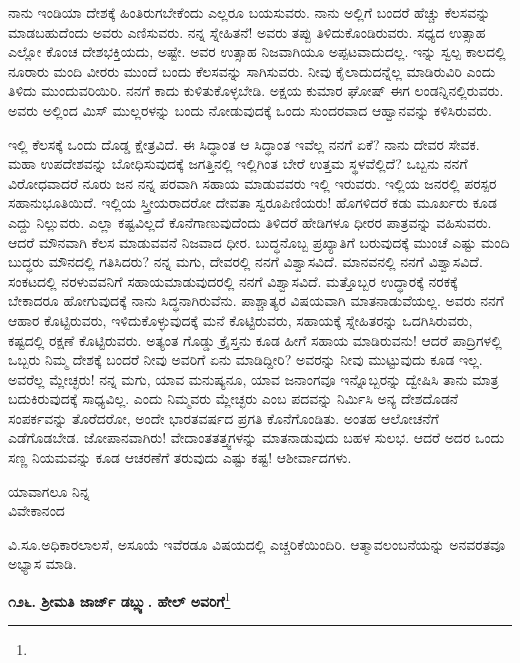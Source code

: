 ನಾನು ಇಂಡಿಯಾ ದೇಶಕ್ಕೆ ಹಿಂತಿರುಗಬೇಕೆಂದು ಎಲ್ಲರೂ ಬಯಸುವರು. ನಾನು ಅಲ್ಲಿಗೆ ಬಂದರೆ ಹೆಚ್ಚು ಕೆಲಸವನ್ನು ಮಾಡಬಹುದೆಂದು ಅವರು ಎಣಿಸುವರು. ನನ್ನ ಸ್ನೇಹಿತನೆ! ಅವರು ತಪ್ಪು ತಿಳಿದುಕೊಂಡಿರುವರು. ಸಧ್ಯದ ಉತ್ಸಾಹ ಎಲ್ಲೋ ಕೊಂಚ ದೇಶಭಕ್ತಿಯದು, ಅಷ್ಟೇ. ಅವರ ಉತ್ಸಾಹ ನಿಜವಾಗಿಯೂ ಅಪ್ಪಟವಾದುದಲ್ಲ. ಇನ್ನು ಸ್ವಲ್ಪ ಕಾಲದಲ್ಲಿ ನೂರಾರು ಮಂದಿ ವೀರರು ಮುಂದೆ ಬಂದು ಕೆಲಸವನ್ನು ಸಾಗಿಸುವರು. ನೀವು ಕೈಲಾದುದನ್ನೆಲ್ಲ ಮಾಡಿರುವಿರಿ ಎಂದು ತಿಳಿದು ಮುಂದುವರಿಯಿರಿ. ನನಗೆ ಕಾದು ಕುಳಿತುಕೊಳ್ಳಬೇಡಿ. ಅಕ್ಷಯ ಕುಮಾರ ಘೋಷ್ ಈಗ ಲಂಡನ್ನಿನಲ್ಲಿರುವರು. ಅವರು ಅಲ್ಲಿಂದ ಮಿಸ್ ಮುಲ್ಲರಳನ್ನು ಬಂದು ನೋಡುವುದಕ್ಕೆ ಒಂದು ಸುಂದರವಾದ ಆಹ್ವಾನವನ್ನು ಕಳಿಸಿರುವರು.

ಇಲ್ಲಿ ಕೆಲಸಕ್ಕೆ ಒಂದು ದೊಡ್ಡ ಕ್ಷೇತ್ರವಿದೆ. ಈ ಸಿದ್ಧಾಂತ ಆ ಸಿದ್ಧಾಂತ ಇವೆಲ್ಲ ನನಗೆ ಏಕೆ? ನಾನು ದೇವರ ಸೇವಕ. ಮಹಾ ಉಪದೇಶವನ್ನು ಬೋಧಿಸುವುದಕ್ಕೆ ಜಗತ್ತಿನಲ್ಲಿ ಇಲ್ಲಿಗಿಂತ ಬೇರೆ ಉತ್ತಮ ಸ್ಥಳವೆಲ್ಲಿದೆ? ಒಬ್ಬನು ನನಗೆ ವಿರೋಧವಾದರೆ ನೂರು ಜನ ನನ್ನ ಪರವಾಗಿ ಸಹಾಯ ಮಾಡುವವರು ಇಲ್ಲಿ ಇರುವರು. ಇಲ್ಲಿಯ ಜನರಲ್ಲಿ ಪರಸ್ಪರ ಸಹಾನುಭೂತಿಯಿದೆ. ಇಲ್ಲಿಯ ಸ್ತ್ರೀಯರಾದರೋ ದೇವತಾ ಸ್ವರೂಪಿಣಿಯರು! ಹೊಗಳಿದರೆ ಕಡು ಮೂರ್ಖರು ಕೂಡ ಎದ್ದು ನಿಲ್ಲುವರು. ಎಲ್ಲಾ ಕಷ್ಟವಿಲ್ಲದೆ ಕೊನೆಗಾಣುವುದೆಂದು ತಿಳಿದರೆ ಹೇಡಿಗಳೂ ಧೀರರ ಪಾತ್ರವನ್ನು ವಹಿಸುವರು. ಆದರೆ ಮೌನವಾಗಿ ಕೆಲಸ ಮಾಡುವವನೆ ನಿಜವಾದ ಧೀರ. ಬುದ್ಧನೊಬ್ಬ ಪ್ರಖ್ಯಾತಿಗೆ ಬರುವುದಕ್ಕೆ ಮುಂಚೆ ಎಷ್ಟು ಮಂದಿ ಬುದ್ಧರು ಮೌನದಲ್ಲಿ ಗತಿಸಿದರು? ನನ್ನ ಮಗು, ದೇವರಲ್ಲಿ ನನಗೆ ವಿಶ್ವಾಸವಿದೆ. ಮಾನವನಲ್ಲಿ ನನಗೆ ವಿಶ್ವಾಸವಿದೆ. ಸಂಕಟದಲ್ಲಿ ನರಳುವವನಿಗೆ ಸಹಾಯಮಾಡುವುದರಲ್ಲಿ ನನಗೆ ವಿಶ್ವಾಸವಿದೆ. ಮತ್ತೊಬ್ಬರ ಉದ್ಧಾರಕ್ಕೆ ನರಕಕ್ಕೆ ಬೇಕಾದರೂ ಹೋಗುವುದಕ್ಕೆ ನಾನು ಸಿದ್ಧನಾಗಿರುವೆನು. ಪಾಶ್ಚಾತ್ಯರ ವಿಷಯವಾಗಿ ಮಾತನಾಡುವೆಯಲ್ಲ. ಅವರು ನನಗೆ ಆಹಾರ ಕೊಟ್ಟಿರುವರು, ಇಳಿದುಕೊಳ್ಳುವುದಕ್ಕೆ ಮನೆ ಕೊಟ್ಟಿರುವರು, ಸಹಾಯಕ್ಕೆ ಸ್ನೇಹಿತರನ್ನು ಒದಗಿಸಿರುವರು, ಕಷ್ಟದಲ್ಲಿ ರಕ್ಷಣೆ ಕೊಟ್ಟಿರುವರು. ಅತ್ಯಂತ ಗೊಡ್ಡು ಕ್ರೈಸ್ತನು ಕೂಡ ಹೀಗೆ ಸಹಾಯ ಮಾಡಿರುವನು! ಆದರೆ ಪಾದ್ರಿಗಳಲ್ಲಿ ಒಬ್ಬರು ನಿಮ್ಮ ದೇಶಕ್ಕೆ ಬಂದರೆ ನೀವು ಅವರಿಗೆ ಏನು ಮಾಡಿದ್ದೀರಿ? ಅವರನ್ನು ನೀವು ಮುಟ್ಟುವುದು ಕೂಡ ಇಲ್ಲ. ಅವರೆಲ್ಲ ಮ್ಲೇಚ್ಛರು! ನನ್ನ ಮಗು, ಯಾವ ಮನುಷ್ಯನೂ, ಯಾವ ಜನಾಂಗವೂ ಇನ್ನೊಬ್ಬರನ್ನು ದ್ವೇಷಿಸಿ ತಾನು ಮಾತ್ರ ಬದುಕಿರುವುದಕ್ಕೆ ಸಾಧ್ಯವಿಲ್ಲ. ಎಂದು ನಿಮ್ಮವರು ಮ್ಲೇಚ್ಛರು ಎಂಬ ಪದವನ್ನು ನಿರ್ಮಿಸಿ ಅನ್ಯ ದೇಶದೊಡನೆ ಸಂಪರ್ಕವನ್ನು ತೊರೆದರೋ, ಅಂದೇ ಭಾರತವರ್ಷದ ಪ್ರಗತಿ ಕೊನೆಗೊಂಡಿತು. ಅಂತಹ ಆಲೋಚನೆಗೆ ಎಡೆಗೊಡಬೇಡ. ಜೋಪಾನವಾಗಿರು! ವೇದಾಂತತತ್ತ್ವಗಳನ್ನು ಮಾತನಾಡುವುದು ಬಹಳ ಸುಲಭ. ಆದರೆ ಅದರ ಒಂದು ಸಣ್ಣ ನಿಯಮವನ್ನು ಕೂಡ ಆಚರಣೆಗೆ ತರುವುದು ಎಷ್ಟು ಕಷ್ಟ! ಆಶೀರ್ವಾದಗಳು.

\vspace{-0.5cm}

\begin{flushright}
ಯಾವಾಗಲೂ ನಿನ್ನ\\ವಿವೇಕಾನಂದ
\end{flushright}

ವಿ.ಸೂ.\enginline{-}ಅಧಿಕಾರಲಾಲಸೆ, ಅಸೂಯೆ ಇವೆರಡೂ ವಿಷಯದಲ್ಲಿ ಎಚ್ಚರಿಕೆಯಿಂದಿರಿ. ಆತ್ಮಾವಲಂಬನೆಯನ್ನು ಅನವರತವೂ ಅಭ್ಯಾಸ ಮಾಡಿ.

\begin{center}
\textbf{೧೨೬. ಶ‍್ರೀಮತಿ ಜಾರ್ಜ್ ಡಬ್ಲ್ಯು. ಹೇಲ್‌ ಅವರಿಗೆ}\footnote{}
\end{center}

